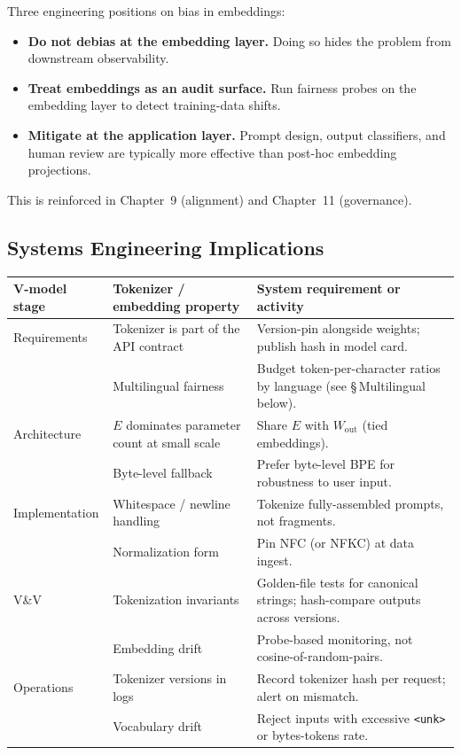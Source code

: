 Three engineering positions on bias in embeddings:
\begin{itemize}
  \item \textbf{Do not debias at the embedding layer.} Doing so hides
        the problem from downstream observability.
  \item \textbf{Treat embeddings as an audit surface.} Run fairness
        probes on the embedding layer to detect training-data shifts.
  \item \textbf{Mitigate at the application layer.} Prompt design,
        output classifiers, and human review are typically more
        effective than post-hoc embedding projections.
\end{itemize}
This is reinforced in Chapter~9 (alignment) and Chapter~11 (governance).

\subsection{Systems Engineering Implications}

\begin{center}
\begin{tabular}{|p{3.4cm}|p{3.4cm}|p{6.8cm}|}
\hline
V-model stage & Tokenizer / embedding property & System requirement or activity \\
\hline
Requirements & Tokenizer is part of the API contract
             & Version-pin alongside weights; publish hash in model
               card. \\
 & Multilingual fairness & Budget token-per-character ratios by
   language (see \S\,Multilingual below). \\
\hline
Architecture & $E$ dominates parameter count at small scale
             & Share $E$ with $W_{\mathrm{out}}$ (tied embeddings). \\
 & Byte-level fallback & Prefer byte-level BPE for
   robustness to user input. \\
\hline
Implementation & Whitespace / newline handling
               & Tokenize fully-assembled prompts, not fragments. \\
 & Normalization form & Pin NFC (or NFKC) at data ingest. \\
\hline
V\&V & Tokenization invariants & Golden-file tests for canonical
   strings; hash-compare outputs across versions. \\
 & Embedding drift & Probe-based monitoring, not
   cosine-of-random-pairs. \\
\hline
Operations & Tokenizer versions in logs
           & Record tokenizer hash per request; alert on mismatch. \\
 & Vocabulary drift & Reject inputs with excessive
   \texttt{<unk>} or bytes-tokens rate. \\
\hline
\end{tabular}
\end{center}

